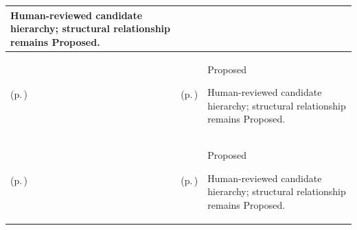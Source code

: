 \begin{longtable}{|>{\raggedright\arraybackslash}p{0.27\TableWidth}|>{\raggedright\arraybackslash}p{0.27\TableWidth}|>{\raggedright\arraybackslash}p{0.46\TableWidth}|}
Human-reviewed candidate hierarchy; structural relationship remains Proposed.\\\hline
\nameref{cap:bec-procedure-administration} (p.\,\pageref{cap:bec-procedure-administration}) & \nameref{cap:bec-reviewed-procedure-surgical-administration} (p.\,\pageref{cap:bec-reviewed-procedure-surgical-administration}) & Proposed

Human-reviewed candidate hierarchy; structural relationship remains Proposed.\\\hline
\nameref{cap:bec-clinical-communication-administration} (p.\,\pageref{cap:bec-clinical-communication-administration}) & \nameref{cap:bec-reviewed-secure-clinical-communication} (p.\,\pageref{cap:bec-reviewed-secure-clinical-communication}) & Proposed

Human-reviewed candidate hierarchy; structural relationship remains Proposed.\\\hline
\end{longtable}\endgroup

